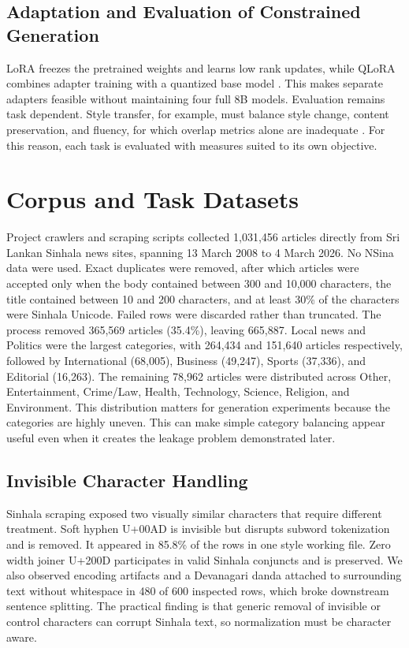 \documentclass[a4paper,conference]{IEEEtran}
\begin{document}
\subsection{Adaptation and Evaluation of Constrained Generation}
LoRA freezes the pretrained weights and learns low rank updates, while QLoRA
combines adapter training with a quantized base model
\cite{hu2022lora,dettmers2023qlora}. This makes separate adapters feasible
without maintaining four full 8B models. Evaluation remains task dependent.
Style transfer, for example, must balance style change, content preservation,
and fluency, for which overlap metrics alone are inadequate
\cite{ostheimer2024tst}. For this reason, each task is evaluated with measures suited to its own objective.

\section{Corpus and Task Datasets}
Project crawlers and scraping scripts collected 1,031,456 articles directly
from Sri Lankan Sinhala news sites, spanning 13 March 2008 to 4 March 2026. No
NSina data were used. Exact duplicates were removed, after which articles were
accepted only when the body contained between 300 and 10,000 characters, the title
contained between 10 and 200 characters, and at least 30\% of the characters were Sinhala Unicode. Failed rows
were discarded rather than truncated. The process removed 365,569 articles
(35.4\%), leaving 665,887. Local news and Politics were the largest categories,
with 264,434 and 151,640 articles respectively, followed by International
(68,005), Business (49,247), Sports (37,336), and Editorial (16,263). The
remaining 78,962 articles were distributed across Other, Entertainment,
Crime/Law, Health, Technology, Science, Religion, and Environment. This
distribution matters for generation experiments because the categories are
highly uneven. This can make simple category balancing
appear useful even when it creates the leakage problem demonstrated later.

\subsection{Invisible Character Handling}
Sinhala scraping exposed two visually similar characters that require different
treatment. Soft hyphen U+00AD is invisible but disrupts subword tokenization and
is removed. It appeared in 85.8\% of the rows in one style working file.
Zero width joiner U+200D participates in valid Sinhala conjuncts and is
preserved. We also observed encoding artifacts and a Devanagari danda attached
to surrounding text without whitespace in 480 of 600 inspected rows, which
broke downstream sentence splitting. The practical finding is that generic
removal of invisible or control characters can corrupt Sinhala text, so
normalization must be character aware.
\end{document}
